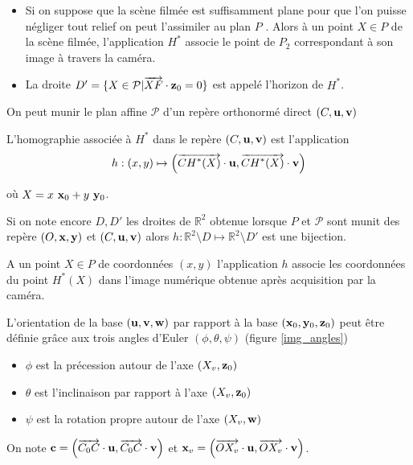 \begin{remarque}
\begin{itemize}
\item Si on suppose que la scène filmée est suffisamment plane pour que l'on puisse  négliger tout relief on peut l'assimiler au plan $P$ . Alors à un point $X\in P$  de la scène filmée, l'application $H^*$ associe le point de $P_2$ correspondant à son image à travers la caméra.
\item La droite $D'=\{ X \in \mathcal{P} | \overrightarrow{XF} \cdot \mathbf{z}_0 =0 \}$ est appelé l'horizon de $H^*$.
\end{itemize}

\end{remarque}
On peut munir le plan affine $\mathcal{P}$ d'un repère orthonormé direct $(C,\mathbf{u},\mathbf{v})$ 
\begin{Def}
 L'homographie associée à $H^*$ dans le repère $(C,\mathbf{u},\mathbf{v})$ est l'application
\begin{equation}
h : (x,y)  \mapsto \left( \overrightarrow{CH^*(X)}\cdot \mathbf{u} , \overrightarrow{CH^*(X)}\cdot \mathbf{v} \right)
\label{formule_homographie_H}
\end{equation}


où $X=x~\mathbf{x}_0 + y~\mathbf{y}_0 $.
\label{def_homographie_H}
\end{Def}
Si on note encore $D,D'$ les droites de $\mathbb{R}^2$ obtenue lorsque $P$ et $\mathcal{P}$ sont munit des repère $(O,\mathbf{x},\mathbf{y})$ et $(C,\mathbf{u},\mathbf{v})$ alors $h:\mathbb{R}^2  \setminus D \mapsto \mathbb{R}^2  \setminus D'$ est une bijection.
\begin{remarque}
A un point $X\in P$ de coordonnées $(x,y)$  l'application $h$ associe les coordonnées  du point $H^*(X)$ dans l'image numérique obtenue après acquisition par la caméra. 
\end{remarque}
L'orientation de la base $(\mathbf{u},\mathbf{v},\mathbf{w})$ par rapport à la base $(\mathbf{x}_0,\mathbf{y}_0,\mathbf{z}_0)$ peut être définie grâce aux trois angles d'Euler $(\phi , \theta ,\psi )$ (figure \ref{img_angles})
\begin{itemize}
\item $\phi$ est la précession autour de l'axe $(X_v ,\mathbf{z}_0)$
\item $\theta$ est l'inclinaison par rapport à l'axe $(X_v , \mathbf{z}_0 )$
\item $\psi$ est la rotation propre autour de l'axe $(X_v , \mathbf{w} )$
\end{itemize}
On note $\mathbf{c}= \left (\overrightarrow{C_0 C}\cdot \mathbf{u} , \overrightarrow{C_0 C}\cdot \mathbf{v} \right)$ et $\mathbf{x}_v=\left( \overrightarrow{O X_v}\cdot \mathbf{u} , \overrightarrow{O X_v}\cdot \mathbf{v} \right )$.\\
